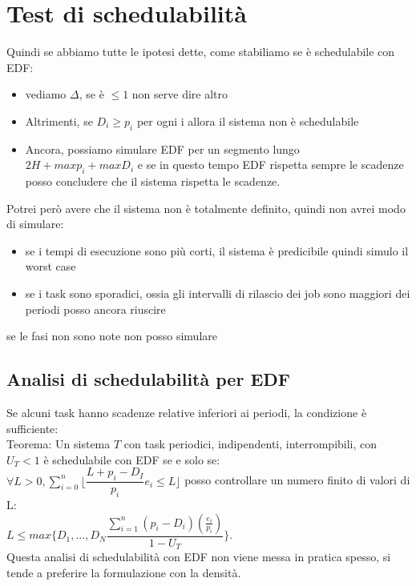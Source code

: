 \documentclass[12pt, oneside]{extbook}
\begin{document}
\section{Test di schedulabilità}
Quindi se abbiamo tutte le ipotesi dette, come stabiliamo se è schedulabile con EDF:
\begin{itemize}
	\item vediamo $\Delta$, se è $\leq 1$ non serve dire altro
	\item Altrimenti, se $D_i \geq p_i$ per ogni i allora il sistema non è schedulabile
	\item Ancora, possiamo simulare EDF per un segmento lungo $2H + max p_i + max D_i$ e se in questo tempo EDF rispetta sempre le scadenze posso concludere che il sistema rispetta le scadenze.
\end{itemize}
Potrei però avere che il sistema non è totalmente definito, quindi non avrei modo di simulare:
\begin{itemize}
	\item se i tempi di esecuzione sono più corti, il sistema è predicibile quindi simulo il worst case
	\item se i task sono sporadici, ossia gli intervalli di rilascio dei job sono maggiori dei periodi posso ancora riuscire
\end{itemize}
se le fasi non sono note non posso simulare
\subsection{Analisi di schedulabilità per EDF}
Se alcuni task hanno scadenze relative inferiori ai periodi, la condizione è sufficiente:\\
Teorema: Un sistema $T$ con task periodici, indipendenti, interrompibili, con $U_T < 1$ è schedulabile con EDF se e solo se:\\
$\forall L > 0, \sum_{i=0}^{n} \lfloor \dfrac{L + p_i - D_I}{p_i} e_i \leq L \rfloor$
posso controllare un numero finito di valori di L:\\
$L \leq max\{D_1, ..., D_N \dfrac{\sum_{i=1}^{n} (p_i - D_i) (\frac{e_i}{p_i})}{1 - U_T} \}$.\\
Questa analisi di schedulabilità con EDF non viene messa in pratica spesso, si tende a preferire la formulazione con la densità.
\end{document}
